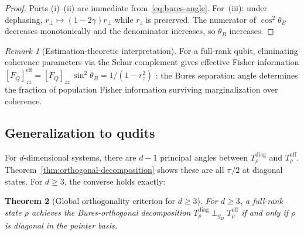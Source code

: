 \documentclass[12pt,a4paper]{article}
\newtheorem{theorem}{Theorem}[section]
\theoremstyle{definition}
\theoremstyle{remark}
\newtheorem{remark}[theorem]{Remark}
\begin{document}
\begin{proof}
Parts (i)--(ii) are immediate from~\eqref{eq:bures-angle}. For~(iii): under dephasing, $r_\perp \mapsto (1{-}2\gamma)r_\perp$ while $r_z$ is preserved. The numerator of $\cos^2\theta_B$ decreases monotonically and the denominator increases, so $\theta_B$ increases.
\end{proof}

\begin{remark}[Estimation-theoretic interpretation]
\label{rem:estimation}
For a full-rank qubit, eliminating coherence parameters via the Schur complement gives effective Fisher information $[F_Q]_{zz}^{\mathrm{eff}} = [F_Q]_{zz}\,\sin^2\theta_B = 1/(1 - r_z^2)$ \cite{zhang2025hybrid,albarelli2019restoring}: the Bures separation angle determines the fraction of population Fisher information surviving marginalization over coherence.
\end{remark}

\subsection{Generalization to qudits}
\label{sec:qudit-angles}

For $d$-dimensional systems, there are $d - 1$ principal angles between $T_\rho^{\mathrm{diag}}$ and $T_\rho^{\mathrm{off}}$. Theorem~\ref{thm:orthogonal-decomposition} shows these are all $\pi/2$ at diagonal states. For $d \geq 3$, the converse holds exactly:

\begin{theorem}[Global orthogonality criterion for $d \geq 3$]
\label{thm:global-orthogonality}
For $d \geq 3$, a full-rank state $\rho$ achieves the Bures-orthogonal decomposition $T_\rho^{\mathrm{diag}} \perp_{g_B} T_\rho^{\mathrm{off}}$ if and only if $\rho$ is diagonal in the pointer basis.
\end{theorem}
\end{document}
